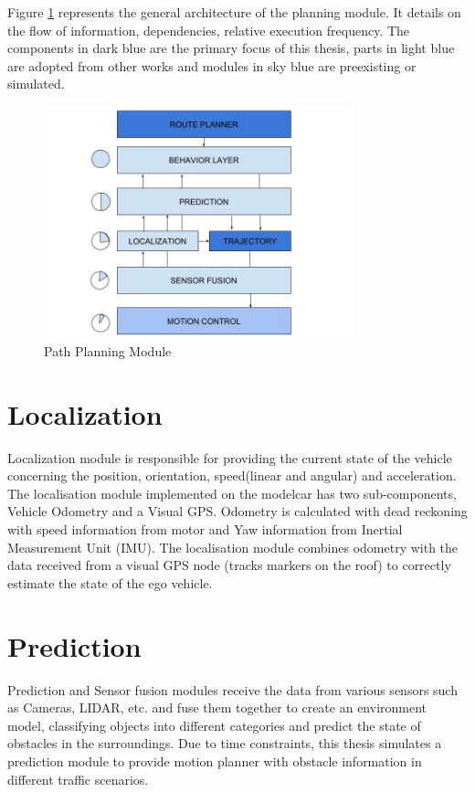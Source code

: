 Figure \ref{path_planner} represents the general architecture of the planning module. It details on the flow of information, dependencies, relative execution frequency. The components in dark blue are the primary focus of this thesis, parts in light blue are adopted from other works and modules in sky blue are preexisting or simulated. 
\begin{figure}[h]
    \centering
    \includegraphics[width=0.8\textwidth]{Images/path_planner.jpg}
    \caption{Path Planning Module}
    \label{path_planner}
\end{figure}

\section{Localization} \label{localization}

Localization module is responsible for providing the current state of the vehicle concerning the position, orientation, speed(linear and angular) and acceleration. The localisation module implemented on the modelcar has two sub-components, Vehicle Odometry and a Visual GPS. Odometry is calculated with dead reckoning \cite{dead_reckoning} with speed information from motor and Yaw information from Inertial Measurement Unit (IMU). The localisation module combines odometry with the data received from a visual GPS node (tracks markers on the roof) to correctly estimate the state of the ego vehicle. 

\section{Prediction} \label{prediction}

Prediction and Sensor fusion modules receive the data from various sensors such as Cameras, LIDAR, etc. and fuse them together to create an environment model, classifying objects into different categories and predict the state of obstacles in the surroundings. Due to time constraints, this thesis simulates a prediction module to provide motion planner with obstacle information in different traffic scenarios.

